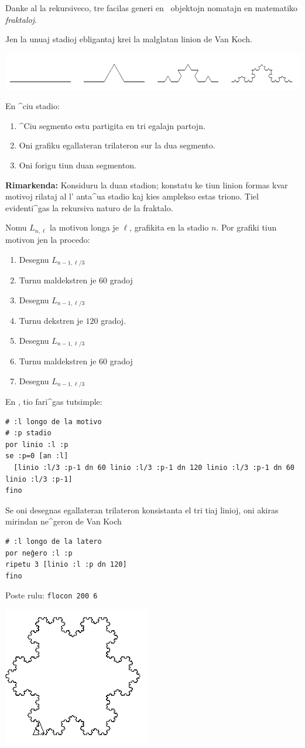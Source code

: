 Danke al la rekursiveco, tre facilas generi en \logo\ objektojn
nomatajn en matematiko \emph{fraktaloj}.

Jen la unuaj stadioj ebligantaj krei la malglatan linion de Van Koch.
\begin{center}
  \includegraphics[width=\textwidth]{bildoj/koch0123.png}
\end{center}
En ^ciu stadio:
\begin{enumerate}
\item ^Ciu segmento estu partigita en tri egalajn partojn.
\item Oni grafiku egallateran trilateron sur la dua segmento.
\item Oni forigu tiun duan segmenton.
\end{enumerate}
\textbf{Rimarkenda:} Konsiduru la duan stadion; konstatu ke tiun
linion formas kvar motivoj rilataj al l' anta^ua stadio kaj kies
amplekso estas triono.  Tiel evidenti^gas la rekursiva naturo de la
fraktalo.

Nomu $L_{n,\ell}$ la motivon longa je $\ell$, grafikita en la stadio $n$.
Por grafiki tiun motivon jen la procedo:
\begin{enumerate}
 \item Desegnu $L_{n-1,\ell/3}$
 \item Turnu maldekstren je $60$ gradoj
 \item Desegnu $L_{n-1,\ell/3}$
 \item Turnu dekstren je $120$ gradoj.
 \item Desegnu $L_{n-1,\ell/3}$
 \item Turnu maldekstren je $60$ gradoj
 \item Desegnu $L_{n-1,\ell/3}$
\end{enumerate}
En \logo, tio fari^gas tutsimple:
\begin{verbatim}
# :l longo de la motivo 
# :p stadio
por linio :l :p
se :p=0 [an :l] 
  [linio :l/3 :p-1 dn 60 linio :l/3 :p-1 dn 120 linio :l/3 :p-1 dn 60 linio :l/3 :p-1]
fino
\end{verbatim}
Se oni desegnas egallateran trilateron konsistanta el tri tiaj linioj,
oni akiras mirindan ne^geron de Van Koch
\begin{verbatim}
# :l longo de la latero
por neĝero :l :p
ripetu 3 [linio :l :p dn 120]
fino
\end{verbatim}
Poste rulu: \texttt{flocon 200 6}
\begin{center}
  \includegraphics{bildoj/flocon.png}
\end{center}
